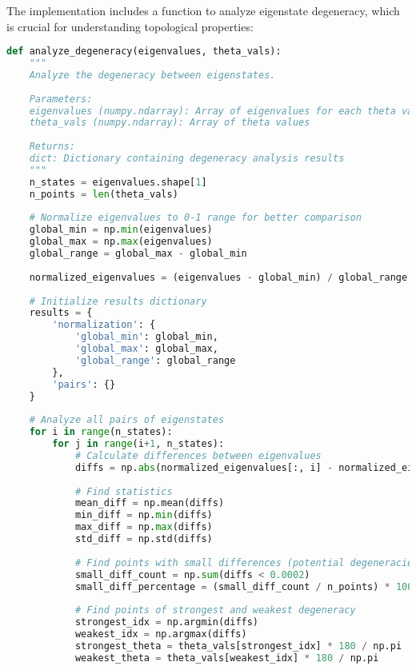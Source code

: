 \documentclass[12pt,a4paper]{article}
\begin{document}
The implementation includes a function to analyze eigenstate degeneracy, which is crucial for understanding topological properties:

\begin{lstlisting}[language=Python, caption=Eigenstate Degeneracy Analysis]
def analyze_degeneracy(eigenvalues, theta_vals):
    """
    Analyze the degeneracy between eigenstates.
    
    Parameters:
    eigenvalues (numpy.ndarray): Array of eigenvalues for each theta value and state
    theta_vals (numpy.ndarray): Array of theta values
    
    Returns:
    dict: Dictionary containing degeneracy analysis results
    """
    n_states = eigenvalues.shape[1]
    n_points = len(theta_vals)
    
    # Normalize eigenvalues to 0-1 range for better comparison
    global_min = np.min(eigenvalues)
    global_max = np.max(eigenvalues)
    global_range = global_max - global_min
    
    normalized_eigenvalues = (eigenvalues - global_min) / global_range
    
    # Initialize results dictionary
    results = {
        'normalization': {
            'global_min': global_min,
            'global_max': global_max,
            'global_range': global_range
        },
        'pairs': {}
    }
    
    # Analyze all pairs of eigenstates
    for i in range(n_states):
        for j in range(i+1, n_states):
            # Calculate differences between eigenvalues
            diffs = np.abs(normalized_eigenvalues[:, i] - normalized_eigenvalues[:, j])
            
            # Find statistics
            mean_diff = np.mean(diffs)
            min_diff = np.min(diffs)
            max_diff = np.max(diffs)
            std_diff = np.std(diffs)
            
            # Find points with small differences (potential degeneracies)
            small_diff_count = np.sum(diffs < 0.0002)
            small_diff_percentage = (small_diff_count / n_points) * 100
            
            # Find points of strongest and weakest degeneracy
            strongest_idx = np.argmin(diffs)
            weakest_idx = np.argmax(diffs)
            strongest_theta = theta_vals[strongest_idx] * 180 / np.pi  # Convert to degrees
            weakest_theta = theta_vals[weakest_idx] * 180 / np.pi      # Convert to degrees
            

\end{lstlisting}
\end{document}
